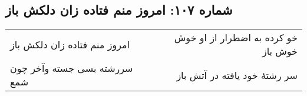 \begin{center}
\section*{شماره ۱۰۷: امروز منم فتاده زان دلکش باز}
\label{sec:107}
\begin{longtable}{l p{0.5cm} r}
امروز منم فتاده زان دلکش باز
&&
خو کرده به اضطرار از او خوش خوش باز
\\
سررشته بسی جسته وآخر چون شمع
&&
سر رشتهٔ خود یافته در آتش باز
\\
\end{longtable}
\end{center}
